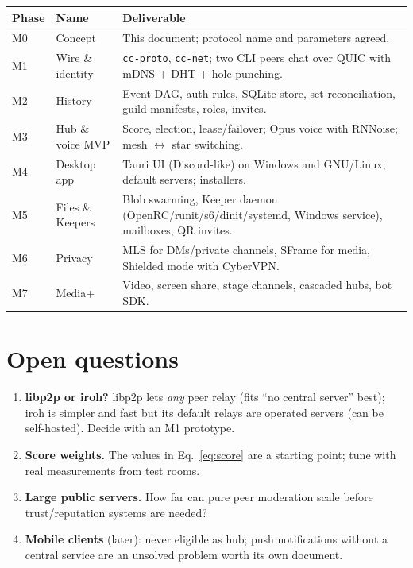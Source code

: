 \documentclass[11pt,a4paper]{article}
\begin{document}
\begin{center}
\small
\begin{tabularx}{\linewidth}{@{}l l Y@{}}
\toprule
\textbf{Phase} & \textbf{Name} & \textbf{Deliverable} \\
\midrule
M0 & Concept & This document; protocol name and parameters agreed. \\
M1 & Wire \& identity & \texttt{cc-proto}, \texttt{cc-net}; two CLI peers chat over QUIC with mDNS + DHT + hole punching. \\
M2 & History & Event DAG, auth rules, SQLite store, set reconciliation, guild manifests, roles, invites. \\
M3 & Hub \& voice MVP & Score, election, lease/failover; Opus voice with RNNoise; mesh $\leftrightarrow$ star switching. \\
M4 & Desktop app & Tauri UI (Discord-like) on Windows and GNU/Linux; default servers; installers. \\
M5 & Files \& Keepers & Blob swarming, Keeper daemon (OpenRC/runit/s6/dinit/systemd, Windows service), mailboxes, QR invites. \\
M6 & Privacy & MLS for DMs/private channels, SFrame for media, Shielded mode with CyberVPN. \\
M7 & Media+ & Video, screen share, stage channels, cascaded hubs, bot SDK. \\
\bottomrule
\end{tabularx}
\end{center}

\section{Open questions}
\begin{enumerate}
  \item \textbf{libp2p or iroh?} libp2p lets \emph{any} peer relay (fits ``no central
        server'' best); iroh is simpler and fast but its default relays are operated
        servers (can be self-hosted). Decide with an M1 prototype.
  \item \textbf{Score weights.} The values in Eq.~\eqref{eq:score} are a starting point; tune
        with real measurements from test rooms.
  \item \textbf{Large public servers.} How far can pure peer moderation scale before
        trust/reputation systems are needed?
  \item \textbf{Mobile clients} (later): never eligible as hub; push notifications without a
        central service are an unsolved problem worth its own document.
\end{enumerate}
\end{document}
